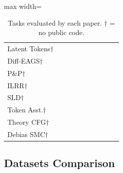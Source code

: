 \documentclass{article}
\newcommand{\gc}{\checkmark}
\begin{document}
\begin{table}[h]
\begin{adjustbox}{max width=\textwidth}
\begin{tabular}{@{}lccccccccc@{}}
Latent Tokens$\dagger$ & \gc & & & & & & & & \\
Diff-EAGS$\dagger$ & \gc & \gc & \gc & & & & & & \\
P\&P$\dagger$ & & \gc & & & & & & \gc & \\
ILRR$\dagger$ & & \gc & & & & & & & \\
SLD$\dagger$ & & & \gc & & & & \gc & & \\
Token Asst.$\dagger$ & & & & & \gc & & \gc & & \\
Theory CFG$\dagger$ & & \gc & & & & & & & \\
Debias SMC$\dagger$ & & \gc & & & & & & & \\
\bottomrule
\end{tabular}
\end{adjustbox}
\caption{Tasks evaluated by each paper. $\dagger$ = no public code.}
\end{table}

\subsection{Datasets Comparison}
\end{document}
